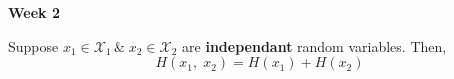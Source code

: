 \documentclass{article}
\begin{document}
\begin{center}
\textbf{\huge{Week 2}}
\end{center}
Suppose $x_1 \in \mathcal{X}_1\, \&\; x_2 \in \mathcal{X}_2$ are \textbf{independant} random variables. Then,
$$ H(x_1,\;x_2)=H(x_1)+H(x_2)$$
\end{document}
